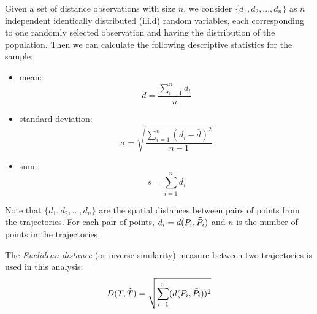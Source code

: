 Given a set of distance observations with size $n$, we consider $\{d_{1}, d_{2}, ..., d_{n}\}$ as $n$ independent identically distributed (i.i.d) random variables, each corresponding to one randomly selected observation and having the distribution of the population. Then we can calculate the following descriptive statistics for the sample:
\begin{itemize}
    \item mean:
     \[ \overline {d} = \frac{\sum_{i=1}^{n} d_{i}}{n}\]
     \item standard deviation:
    \[ \sigma={\sqrt {\frac {\sum _{i=1}^{n}(d_{i}-{\overline {d}})^{2}}{n-1}}}\]
    \item sum:        
    \[s = \sum_{i=1}^{n} d_{i}\]
\end{itemize}

Note that $\{d_{1}, d_{2}, ..., d_{n}\}$ are the spatial distances between pairs of points from the trajectories. For each pair of points, $d_{i} = d(P_{i},\Tilde{P_{i}})$ and $n$ is the number of points in the trajectories.

The \textit{Euclidean distance} (or inverse similarity) measure between two trajectories is used in this analysis:
\[D(T,\Tilde{T}) = \sqrt{\sum_{i=1}^{n} (d(P_{i},\Tilde{P_{i}}))^{2}}\]





